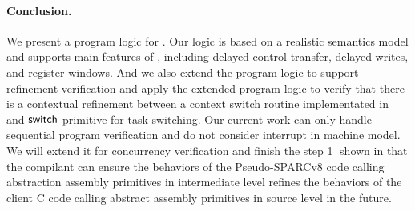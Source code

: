 \paragraph{\textbf{Conclusion.}}
We present a program logic for \sparc.
Our logic is based on a realistic semantics
model and supports main features of \sparc,
including delayed control transfer, delayed writes,
and register windows.
And we also extend the program logic to support 
refinement verification and apply the extended 
program logic to verify 
that there is a contextual refinement between 
a context switch routine implementated 
in \sparc{} and $\mathsf{switch}$ primitive for task switching. 
Our current work can only handle
sequential \sparc{} program verification and 
do not consider interrupt in machine model.  
We will extend it for concurrency verification 
and finish the step {\color{blue} \textcircled{1}} shown in
\Fig{\ref{fig:idea to establish contextual refinement}}
that the compilant can ensure the behaviors 
of the Pseudo-SPARCv8 code calling abstraction assembly 
primitives in intermediate level refines 
the behaviors of 
the client C code calling abstract assembly primitives 
in source level in the future. 
